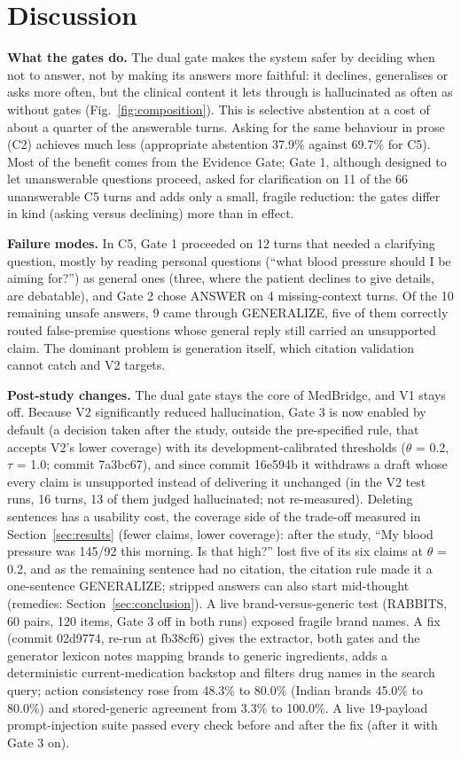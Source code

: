 \documentclass[conference]{IEEEtran}
\begin{document}
\section{Discussion}\label{sec:discussion}

\textbf{What the gates do.} The dual gate makes the system safer by deciding when not to answer, not by making its answers more faithful: it declines, generalises or asks more often, but the clinical content it lets through is hallucinated as often as without gates (Fig.~\ref{fig:composition}). This is selective abstention \cite{geifman2017selective} at a cost of about a quarter of the answerable turns. Asking for the same behaviour in prose (C2) achieves much less (appropriate abstention 37.9\% against 69.7\% for C5). Most of the benefit comes from the Evidence Gate; Gate 1, although designed to let unanswerable questions proceed, asked for clarification on 11 of the 66 unanswerable C5 turns and adds only a small, fragile reduction: the gates differ in kind (asking versus declining) more than in effect.

\textbf{Failure modes.} In C5, Gate 1 proceeded on 12 turns that needed a clarifying question, mostly by reading personal questions (``what blood pressure should I be aiming for?'') as general ones (three, where the patient declines to give details, are debatable), and Gate 2 chose ANSWER on 4 missing-context turns. Of the 10 remaining unsafe answers, 9 came through GENERALIZE, five of them correctly routed false-premise questions whose general reply still carried an unsupported claim. The dominant problem is generation itself, which citation validation cannot catch and V2 targets.

\textbf{Post-study changes.} The dual gate stays the core of MedBridge, and V1 stays off. Because V2 significantly reduced hallucination, Gate 3 is now enabled by default (a decision taken after the study, outside the pre-specified rule, that accepts V2's lower coverage) with its development-calibrated thresholds ($\theta$ = 0.2, $\tau$ = 1.0; commit 7a3bc67), and since commit 16e594b it withdraws a draft whose every claim is unsupported instead of delivering it unchanged (in the V2 test runs, 16 turns, 13 of them judged hallucinated; not re-measured). Deleting sentences has a usability cost, the coverage side of the trade-off measured in Section~\ref{sec:results} (fewer claims, lower coverage): after the study, ``My blood pressure was 145/92 this morning. Is that high?'' lost five of its six claims at $\theta$ = 0.2, and as the remaining sentence had no citation, the citation rule made it a one-sentence GENERALIZE; stripped answers can also start mid-thought (remedies: Section~\ref{sec:conclusion}). A live brand-versus-generic test (RABBITS, 60 pairs, 120 items, Gate 3 off in both runs) exposed fragile brand names. A fix (commit 02d9774, re-run at fb38cf6) gives the extractor, both gates and the generator lexicon notes mapping brands to generic ingredients, adds a deterministic current-medication backstop and filters drug names in the search query; action consistency rose from 48.3\% to 80.0\% (Indian brands 45.0\% to 80.0\%) and stored-generic agreement from 3.3\% to 100.0\%. A live 19-payload prompt-injection suite passed every check before and after the fix (after it with Gate 3 on).
\end{document}
